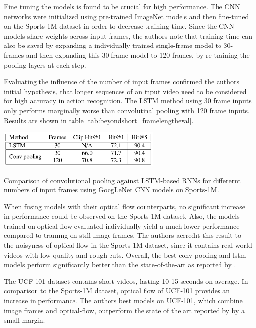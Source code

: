 Fine tuning the models is found to be crucial for high performance.
The CNN networks were initialized using pre-trained ImageNet models and then fine-tuned on the Sports-1M dataset in order to decrease training time.
Since the CNN models share weights across input frames, the authors note that training time can also be saved by expanding a individually trained single-frame model to 30-frames and then expanding this 30 frame model to 120 frames, by re-training the pooling layers at each step.


Evaluating the influence of the number of input frames confirmed the authors initial hypothesis, that longer sequences of an input video need to be considered for high accuracy in action recognition.
The LSTM method using 30 frame inputs only performs marginally worse than convolutinal pooling with 120 frame inputs.
Results are shown in table \ref{tab:beyondshort_framelengtheval}.

\begin{table}[H]
    \centering
    \includegraphics[width=0.6\textwidth]{img_deep/beyondshort_framelengtheval}
    \caption{Comparison of convolutional pooling against LSTM-based RNNs for differernt numbers of input frames using GoogLeNet CNN models on Sports-1M. \cite{ng_beyond_2015}}
    \label{tab:beyondshort_framelengtheval}
\end{table}

When fusing models with their optical flow counterparts, no significant increase in performance could be observed on the Sports-1M dataset.
Also, the models trained on optical flow evaluated individually yield a much lower performance compared to training on still image frames.
The authors accredit this result to the noisyness of optical flow in the Sports-1M dataset, since it contains real-world videos with low quality and rough cuts.
Overall, the best conv-pooling and lstm models perform significantly better than the state-of-the-art as reported by \textcite{karpathy_large-scale_2014}.

The UCF-101 dataset contains short videos, lasting 10-15 seconds on average.
In comparison to the Sports-1M dataset, optical flow of UCF-101 provides an increase in performance.
The authors best models on UCF-101, which combine image frames and optical-flow, outperform the state of the art reported by \textcite{simonyan_two-stream_2014} by a small margin.


